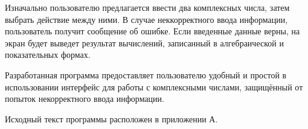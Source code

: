 Изначально пользователю предлагается ввести два комплексных числа, затем выбрать действие между ними. В случае неккорректного ввода информации, пользователь получит сообщение об ошибке. Если введенные данные верны, на экран будет выведет результат вычислений, записанный в алгебраической и показательных формах.

Разработанная программа предоставляет пользователю удобный и простой в использовании интерфейс для работы с комплексными числами, защищённый от попыток некорректного ввода информации.

Исходный текст программы расположен в приложении А.

\newpage